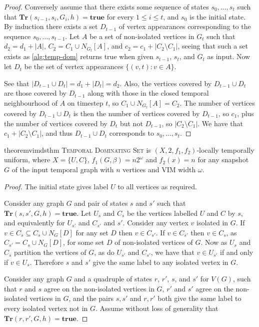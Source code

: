 \documentclass[a4paper,UKenglish,cleveref, autoref, thm-restate]{lipics-v2021} %
\begin{document}
\begin{toappendix}
\begin{proof}
     Conversely assume that there exists some sequence of states $s_0, ..., s_t$ such that $\textbf{Tr}(s_{i-1}, s_i, G_i,h)=\textbf{true}$ for every $1 \leq i \leq t$, and $s_0$ is the initial state. By induction there exists a set $D_{t-1}$ of vertex appearances corresponding to the sequence $s_0, ..., s_{t-1}$. Let $A$ be a set of non-isolated vertices in $G_t$ such that $d_2 = d_1 + |A|$, $C_2 = C_1 \cup N_{G_t}[A]$, and $c_2 = c_1 + |C_2 \setminus C_1|$, seeing that such a set exists as \cref{alg:temp-dom} returns true when given $s_{t-1}$, $s_t$, and $G_t$ as input. Now let $D_t$ be the set of vertex appearances $\{(v, t) : v \in A\}$.

     See that $|D_{t-1} \cup D_t| = d_1 + |D_t| = d_2$. Also, the vertices covered by $D_{t-1} \cup D_t$ are those covered by $D_{t-1}$ along with those in the closed temporal neighbourhood of $A$ on timestep $t$, so $C_1 \cup N_{G_t}[A]=C_2$. The number of vertices covered by $D_{t-1} \cup D_t$ is then the number of vertices covered by $D_{t-1}$, so $c_1$, plus the number of vertices covered by $D_t$ but not $D_{t-1}$, so $|C_2 \setminus C_1|$. We have that $c_1 + |C_2 \setminus C_1|$, and thus $D_{t-1} \cup D_t$ corresponds to $s_0, ..., s_t$.
 \end{proof}
 \begin{restatable}{theorem}{vimdsthm}
     \textsc{Temporal Dominating Set} is $(X,2,f_1,f_2)$-locally temporally uniform, where $X=\{U,C\}$, $f_1(G,\beta)=n2^{\omega}$ and $f_2(x)=n$ for any snapshot $G$ of the input temporal graph with $n$ vertices and VIM width $\omega$.
     \end{restatable}
 \begin{proof}
     The initial state gives label $U$ to all vertices as required.

     Consider any graph $G$ and pair of states $s$ and $s'$ such that $\textbf{Tr}(s, s', G,h)=\textbf{true}$. Let $U_s$ and $C_s$ be the vertices labelled $U$ and $C$ by $s$, and equivalently for $U_{s'}$ and $C_{s'}$ and $s'$. Consider any vertex $v$ isolated in $G$. If $v \in C_s \subseteq C_s \cup N_G[D]$ for any set $D$ then $v \in C_{s'}$. If $v \in C_{s'}$ then $v \in C_s$, as $C_{s'} = C_s \cup N_G[D]$, for some set $D$ of non-isolated vertices of $G$. Now as $U_s$ and $C_s$ partition the vertices of $G$, as do $U_{s'}$ and $C_{s'}$, we have that $v \in U_{s'}$ if and only if $v \in U_s$. Therefore $s$ and $s'$ give the same label to any isolated vertex in $G$.

     Consider any graph $G$ and a quadruple of states $r$, $r'$, $s$, and $s'$ for $V(G)$, such that $r$ and $s$ agree on the non-isolated vertices in $G$, $r'$ and $s'$ agree on the non-isolated vertices in $G$, and the pairs $s,s'$ and $r,r'$ both give the same label to every isolated vertex not in $G$. Assume without loss of generality that $\textbf{Tr}(r, r', G,h)=\textbf{true}$.


\end{proof}
\end{toappendix}
\end{document}
